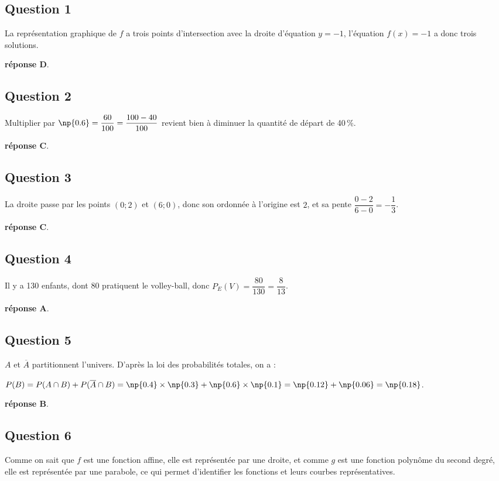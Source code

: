 \subsection*{Question 1}
	La représentation graphique de $f$ a trois points d'intersection avec la droite d'équation {$y=-1$}, l'équation {$f(x)=-1$} a donc trois solutions.

	\textbf{réponse D}.

\subsection*{Question 2}

	Multiplier par {$\np{0.6}=\dfrac{60}{100}=\dfrac{100-40}{100}$} revient bien à diminuer la quantité de départ de 40\,\%.

	\textbf{réponse C}.

\subsection*{Question 3}

	La droite passe par les points {$(0;2)$} et {$(6;0)$}, donc son ordonnée à l'origine est $2$, et sa pente {$\dfrac{0-2}{6-0}=-\dfrac13$}.

	\textbf{réponse C}.

\subsection*{Question 4}

	Il y a 130 enfants, dont 80 pratiquent le volley-ball, donc {$P_E(V)=\dfrac{80}{130}=\dfrac{8}{13}$}.

	\textbf{réponse A}.

\subsection*{Question 5}

	$A$ et $\overline{A}$ partitionnent l'univers. D'après la loi des probabilités totales, on a :

	{$P(B)=P(A\cap B)+P(\overline{A}\cap B)=\np{0.4}\times\np{0.3}+\np{0.6}\times\np{0.1}=\np{0.12}+\np{0.06}=\np{0.18}$}.

	\textbf{réponse B}.

\subsection*{Question 6}
	Comme on sait que $f$ est une fonction affine, elle est représentée par une droite, et comme $g$ est une fonction polynôme du second degré, elle est représentée par une parabole, ce qui permet d'identifier les fonctions et leurs courbes représentatives.

